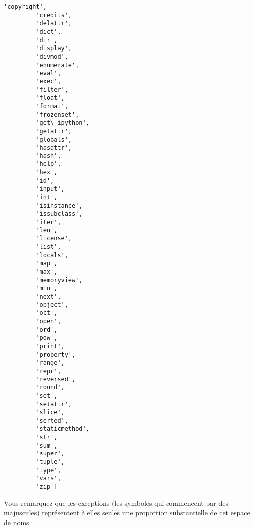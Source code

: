 \begin{Verbatim}[commandchars=\\\{\},frame=single,framerule=0.3mm,rulecolor=\color{cellframecolor}]
         'copyright',
         'credits',
         'delattr',
         'dict',
         'dir',
         'display',
         'divmod',
         'enumerate',
         'eval',
         'exec',
         'filter',
         'float',
         'format',
         'frozenset',
         'get\_ipython',
         'getattr',
         'globals',
         'hasattr',
         'hash',
         'help',
         'hex',
         'id',
         'input',
         'int',
         'isinstance',
         'issubclass',
         'iter',
         'len',
         'license',
         'list',
         'locals',
         'map',
         'max',
         'memoryview',
         'min',
         'next',
         'object',
         'oct',
         'open',
         'ord',
         'pow',
         'print',
         'property',
         'range',
         'repr',
         'reversed',
         'round',
         'set',
         'setattr',
         'slice',
         'sorted',
         'staticmethod',
         'str',
         'sum',
         'super',
         'tuple',
         'type',
         'vars',
         'zip']
\end{Verbatim}
            
    Vous remarquez que les exceptions (les symboles qui commencent par des
majuscules) représentent à elles seules une proportion substantielle de
cet espace de noms.


    
    
    
